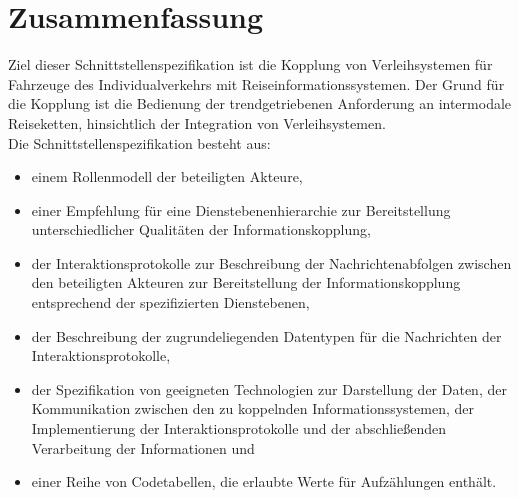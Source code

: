 \chapter{Zusammenfassung}
\label{cha:Zusammenfassung}

Ziel dieser Schnittstellenspezifikation ist die Kopplung von Verleihsystemen für Fahrzeuge des Individualverkehrs mit Reiseinformationssystemen. Der Grund für die Kopplung ist die Bedienung der trendgetriebenen Anforderung an intermodale Reiseketten,  hinsichtlich der Integration von Verleihsystemen.\\

Die Schnittstellenspezifikation besteht aus:\begin{itemize}
\item einem Rollenmodell der beteiligten Akteure,
\item einer Empfehlung für eine Dienstebenenhierarchie zur Bereitstellung unterschiedlicher Qualitäten der Informationskopplung,
\item der Interaktionsprotokolle zur Beschreibung der Nachrichtenabfolgen zwischen den beteiligten Akteuren zur Bereitstellung der Informationskopplung entsprechend der spezifizierten Dienstebenen,
\item der Beschreibung der zugrundeliegenden Datentypen für die Nachrichten der Interaktionsprotokolle,
\item der Spezifikation von geeigneten Technologien zur Darstellung der Daten, der Kommunikation zwischen den zu koppelnden Informationssystemen, der Implementierung der Interaktionsprotokolle und der abschließenden Verarbeitung der Informationen und
\item einer Reihe von Codetabellen, die erlaubte Werte für Aufzählungen enthält.
\end{itemize}
